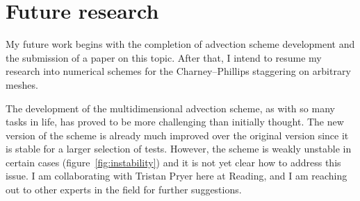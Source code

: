 \documentclass[a4paper,11pt]{article}
\begin{document}

\section{Future research}
My future work begins with the completion of advection scheme development and the submission of a paper on this topic.  After that, I intend to resume my research into numerical schemes for the Charney--Phillips staggering on arbitrary meshes.

The development of the multidimensional advection scheme, as with so many tasks in life, has proved to be more challenging than initially thought.  The new version of the scheme is already much improved over the original version since it is stable for a larger selection of tests.  However, the scheme is weakly unstable in certain cases (figure~\ref{fig:instability}) and it is not yet clear how to address this issue.  I am collaborating with Tristan Pryer here at Reading, and I am reaching out to other experts in the field for further suggestions.
\end{document}
